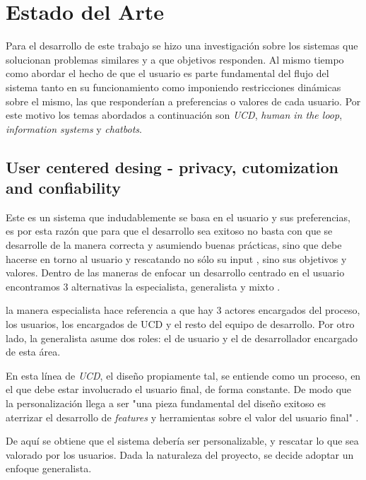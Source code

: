 \section{Estado del Arte}
    \par Para el desarrollo de este trabajo se hizo una investigación sobre los sistemas que solucionan problemas similares y a que objetivos responden. Al mismo tiempo como abordar el hecho de que el usuario es parte fundamental del flujo del sistema tanto en su funcionamiento como imponiendo restricciones dinámicas sobre el mismo, las que responderían a preferencias o valores de cada usuario. Por este motivo los temas abordados a continuación son \textit{\acrfull{UCD}}, \textit{human in the loop}, \textit{information systems} y \textit{chatbots}.
    
    \subsection{User centered desing - privacy, cutomization and confiability}
    \par Este es un sistema que indudablemente se basa en el usuario y sus preferencias, es por esta razón que para que el desarrollo sea exitoso no basta con que se desarrolle de la manera correcta y asumiendo buenas prácticas, sino que debe hacerse en torno al usuario y rescatando no sólo su input \cite{Karat1997}, sino sus objetivos y valores. Dentro de las maneras de enfocar un desarrollo centrado en el usuario encontramos 3 alternativas la especialista, generalista y mixto \cite{Fox2008}.
    \par la manera especialista hace referencia a que hay 3 actores encargados del proceso, los usuarios, los encargados de \acrshort{UCD} y el resto del equipo de desarrollo. Por otro lado, la generalista asume dos roles: el de usuario y el de desarrollador encargado de esta área.
    \par En esta línea de \textit{\acrlong{UCD}}, el diseño propiamente tal, se entiende como un proceso, en el que debe estar involucrado el usuario final, de forma constante.
    De modo que la personalización llega a ser "una pieza fundamental del diseño exitoso es aterrizar el desarrollo de \textit{features} y herramientas sobre el valor del usuario final" \cite{Kramer2000}.
    \par De aquí se obtiene que el sistema debería ser personalizable, y rescatar lo que sea valorado por los usuarios. Dada la naturaleza del proyecto, se decide adoptar un enfoque generalista.
    
